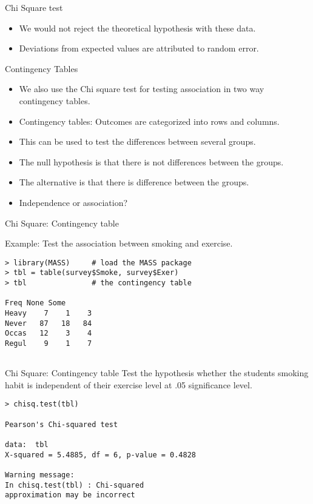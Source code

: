 \documentclass[a4paper,12pt]{article}
\begin{document}
{Chi Square test}
\begin{itemize}
	\item We would not reject the theoretical hypothesis with these data.
	\item Deviations from expected values are attributed to random error.
\end{itemize}


{Contingency Tables}

\begin{itemize}
	\item We also use the Chi square test for testing association in two way
	contingency tables.
	\item Contingency tables: Outcomes are categorized into rows and columns.
	\item This can be used to test the differences between several groups.
	\item The null hypothesis is that there is not differences between the groups.
	\item The alternative is that there is difference between the groups.
	\item Independence or association?
\end{itemize}





{Chi Square: Contingency table}

Example: Test the association between smoking and exercise.

\begin{verbatim}
> library(MASS)     # load the MASS package
> tbl = table(survey$Smoke, survey$Exer)
> tbl               # the contingency table

Freq None Some
Heavy    7    1    3
Never   87   18   84
Occas   12    3    4
Regul    9    1    7


\end{verbatim}


{Chi Square: Contingency table}
Test the hypothesis whether the students smoking habit is independent of their exercise level at .05 significance level.
\begin{verbatim}
> chisq.test(tbl)

Pearson's Chi-squared test

data:  tbl
X-squared = 5.4885, df = 6, p-value = 0.4828

Warning message:
In chisq.test(tbl) : Chi-squared
approximation may be incorrect

\end{verbatim}
\end{document}
